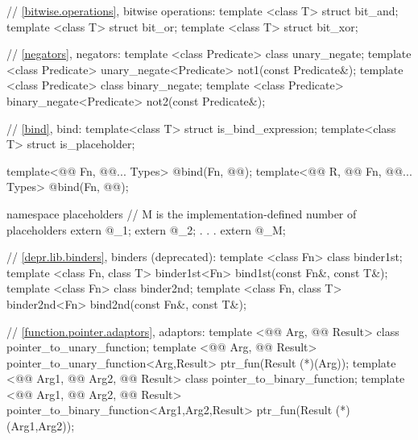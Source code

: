 \documentclass[american,twoside]{book}
\begin{document}
\begin{codeblock}
{  // \ref{bitwise.operations}, bitwise operations:
  template <class T> struct bit_and;
  template <class T> struct bit_or;
  template <class T> struct bit_xor;

  // \ref{negators}, negators:
  template <class Predicate> class unary_negate;
  template <class Predicate>
    unary_negate<Predicate>  not1(const Predicate&);
  template <class Predicate> class binary_negate;
  template <class Predicate>
    binary_negate<Predicate> not2(const Predicate&);

  // \ref{bind}, bind:
  template<class T> struct is_bind_expression;
  template<class T> struct is_placeholder;

  template<@@ Fn, @@... Types>
    @\unspec@ bind(Fn, @@);
  template<@@ R, @@ Fn, @@... Types>
    @\unspec@ bind(Fn, @@);

  namespace placeholders {
    // M is the implementation-defined number of placeholders
    extern @\unspec@ _1;
    extern @\unspec@ _2;
                .
                .
                .
    extern @\unspec@ _M;
  }  

  // \ref{depr.lib.binders}, binders (deprecated):
  template <class Fn> class binder1st;
  template <class Fn, class T>
    binder1st<Fn> bind1st(const Fn&, const T&);
  template <class Fn> class binder2nd;
  template <class Fn, class T>
    binder2nd<Fn> bind2nd(const Fn&, const T&);

  // \ref{function.pointer.adaptors}, adaptors:
  template <@@ Arg, @@ Result> 
    class pointer_to_unary_function;
  template <@@ Arg, @@ Result>
    pointer_to_unary_function<Arg,Result> ptr_fun(Result (*)(Arg));
  template <@@ Arg1, @@ Arg2, @@ Result>
    class pointer_to_binary_function;
  template <@@ Arg1, @@ Arg2, @@ Result>
    pointer_to_binary_function<Arg1,Arg2,Result>
      ptr_fun(Result (*)(Arg1,Arg2));

}
\end{codeblock}
\end{document}

